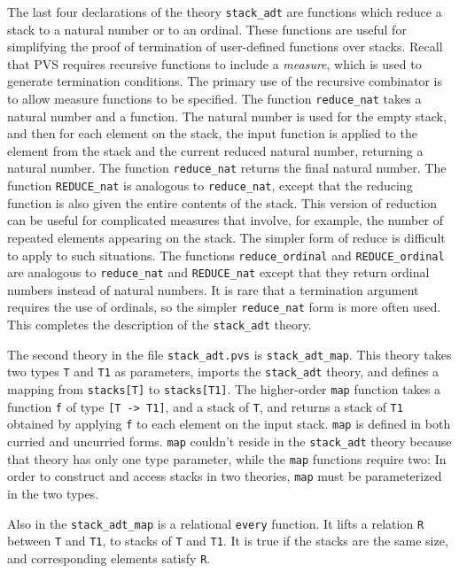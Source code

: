 The last four declarations of the theory \texttt{stack\_adt} are functions
which reduce a stack to a natural number or to an ordinal.  These
functions are useful for simplifying the proof of termination of
user-defined functions over stacks.  Recall that PVS requires recursive
functions to include a \emph{measure}, which is used to generate
termination conditions.  The primary use of the recursive combinator is to
allow measure functions to be specified.  The function
\texttt{reduce\_nat} takes a natural number and a function.  The natural
number is used for the empty stack, and then for each element on the
stack, the input function is applied to the element from the stack and the
current reduced natural number, returning a natural number.  The function
\texttt{reduce\_nat} returns the final natural number.  The function
\texttt{REDUCE\_nat} is analogous to \texttt{reduce\_nat}, except that the
reducing function is also given the entire contents of the stack.  This
version of reduction can be useful for complicated measures that involve,
for example, the number of repeated elements appearing on the stack.  The
simpler form of reduce is difficult to apply to such situations.  The
functions \texttt{reduce\_ordinal} and \texttt{REDUCE\_ordinal} are
analogous to \texttt{reduce\_nat} and \texttt{REDUCE\_nat} except that
they return ordinal numbers instead of natural numbers.  It is rare that a
termination argument requires the use of ordinals, so the simpler
\texttt{reduce\_nat} form is more often used.  This completes the
description of the \texttt{stack\_adt} theory.

The second theory in the file \texttt{stack\_adt.pvs} is
\texttt{stack\_adt\_map}.  This theory takes two types \texttt{T} and
\texttt{T1} as parameters, imports the \texttt{stack\_adt} theory, and
defines a mapping from \texttt{stacks[T]} to \texttt{stacks[T1]}.  The
higher-order \texttt{map} function takes a function \texttt{f} of type
\texttt{[T -> T1]}, and a stack of \texttt{T}, and returns a stack of
\texttt{T1} obtained by applying \texttt{f} to each element on the input
stack.  \texttt{map} is defined in both curried and uncurried forms.
\texttt{map} couldn't reside in the \texttt{stack\_adt} theory because
that theory has only one type parameter, while the \texttt{map} functions
require two: In order to construct and access stacks in two theories,
\texttt{map} must be parameterized in the two types.

Also in the \texttt{stack\_adt\_map} is a relational \texttt{every}
function.  It lifts a relation \texttt{R} between \texttt{T} and \texttt{T1},
to stacks of \texttt{T} and \texttt{T1}.  It is true if the stacks are the
same size, and corresponding elements satisfy \texttt{R}.

